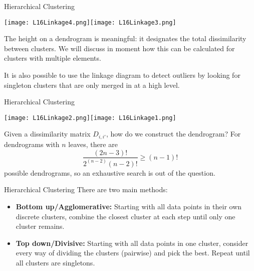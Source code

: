 \documentclass[10pt, table, dvipsnames,xcdraw, handout]{beamer}
\begin{document}
\begin{frame}[fragile]{Hierarchical Clustering}
  \begin{minipage}[t][0.5\textheight][t]{\textwidth}
	\centering \texttt{[image: L16Linkage4.png]}\texttt{[image: L16Linkage3.png]}
  \end{minipage}
  \vfill
\begin{minipage}[t][0.5\textheight][t]{\textwidth}
The height on a dendrogram is meaningful: it designates the total dissimilarity between clusters. We will discuss in moment how this can be calculated for clusters with multiple elements. 

It is also possible to use the linkage diagram to detect outliers by looking for singleton clusters that are only merged in at a high level.
\end{minipage}
\end{frame}

\begin{frame}[fragile]{Hierarchical Clustering}
  \begin{minipage}[t][0.5\textheight][t]{\textwidth}
	\centering \texttt{[image: L16Linkage2.png]}\texttt{[image: L16Linkage1.png]}
  \end{minipage}
  \vfill
\begin{minipage}[t][0.5\textheight][t]{\textwidth}
Given a dissimilarity matrix $D_{i,i'}$, how do we construct the dendrogram? For dendrograms with $n$ leaves, there are
$$
\frac{(2n-3)!}{2^{(n-2)}(n-2)!}\geq {(n-1)!}
$$
possible dendrograms, so an exhaustive search is out of the question. 
\end{minipage}
\end{frame}



\begin{frame}[fragile]{Hierarchical Clustering}
There are two main methods: 
\begin{itemize}
\item[] \textbf{Bottom up/Agglomerative:} Starting with all data points in their own discrete clusters, combine the closest cluster at each step until only one cluster remains. \pause
\item[] \textbf{Top down/Divisive:} Starting with all data points in one cluster, consider every way of dividing the clusters (pairwise) and pick the best. Repeat until all clusters are singletons. 
\end{itemize}
\end{frame}
\end{document}

